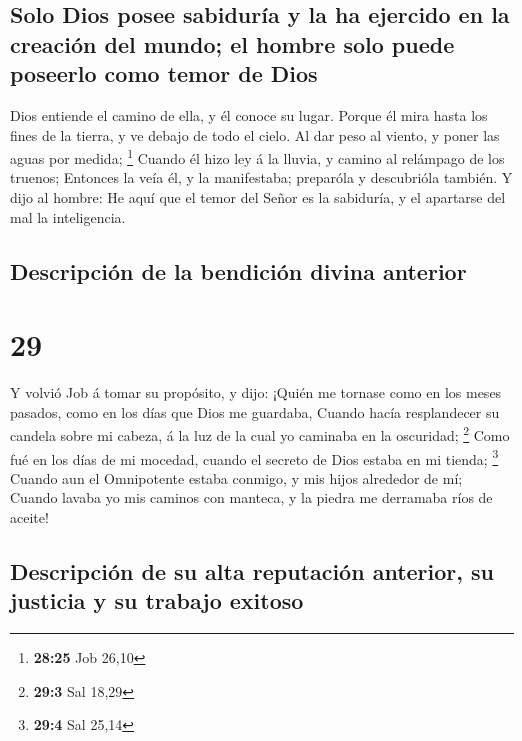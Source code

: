 \hypertarget{solo-dios-posee-sabiduruxeda-y-la-ha-ejercido-en-la-creaciuxf3n-del-mundo-el-hombre-solo-puede-poseerlo-como-temor-de-dios}{%
\subsection{Solo Dios posee sabiduría y la ha ejercido en la creación
del mundo; el hombre solo puede poseerlo como temor de
Dios}\label{solo-dios-posee-sabiduruxeda-y-la-ha-ejercido-en-la-creaciuxf3n-del-mundo-el-hombre-solo-puede-poseerlo-como-temor-de-dios}}

 Dios entiende el camino de ella, y él conoce su lugar.
 Porque él mira hasta los fines de la tierra, y ve debajo
de todo el cielo.  Al dar peso al viento, y poner las
aguas por medida; \footnote{\textbf{28:25} Job 26,10} 
Cuando él hizo ley á la lluvia, y camino al relámpago de los truenos;
 Entonces la veía él, y la manifestaba; preparóla y
descubrióla también.  Y dijo al hombre: He aquí que el
temor del Señor es la sabiduría, y el apartarse del mal la inteligencia.

\hypertarget{descripciuxf3n-de-la-bendiciuxf3n-divina-anterior}{%
\subsection{Descripción de la bendición divina
anterior}\label{descripciuxf3n-de-la-bendiciuxf3n-divina-anterior}}

\hypertarget{section-28}{%
\section{29}\label{section-28}}

 Y volvió Job á tomar su propósito, y dijo: 
¡Quién me tornase como en los meses pasados, como en los días que Dios
me guardaba,  Cuando hacía resplandecer su candela sobre
mi cabeza, á la luz de la cual yo caminaba en la oscuridad; \footnote{\textbf{29:3}
  Sal 18,29}  Como fué en los días de mi mocedad, cuando
el secreto de Dios estaba en mi tienda; \footnote{\textbf{29:4} Sal
  25,14}  Cuando aun el Omnipotente estaba conmigo, y mis
hijos alrededor de mí;  Cuando lavaba yo mis caminos con
manteca, y la piedra me derramaba ríos de aceite!

\hypertarget{descripciuxf3n-de-su-alta-reputaciuxf3n-anterior-su-justicia-y-su-trabajo-exitoso}{%
\subsection{Descripción de su alta reputación anterior, su justicia y su
trabajo
exitoso}\label{descripciuxf3n-de-su-alta-reputaciuxf3n-anterior-su-justicia-y-su-trabajo-exitoso}}

